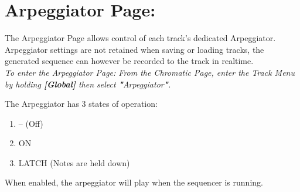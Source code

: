 \chapter{Arpeggiator Page:}
The Arpeggiator Page allows control of each track's dedicated Arpeggiator. Arpeggiator settings are not retained when saving or loading tracks, the generated sequence can however be recorded to the track in realtime.
\\
\textit{To enter the Arpeggiator Page: From the Chromatic Page, enter the Track Menu by holding\textbf{ [Global]} then select \textbf{"}Arpeggiator\textbf{"}. }

The Arpeggiator has 3 states of operation:
\begin{enumerate}
    \item -- (Off)
    \item ON
    \item LATCH (Notes are held down)
\end{enumerate}

When enabled, the arpeggiator will play when the sequencer is running. 

